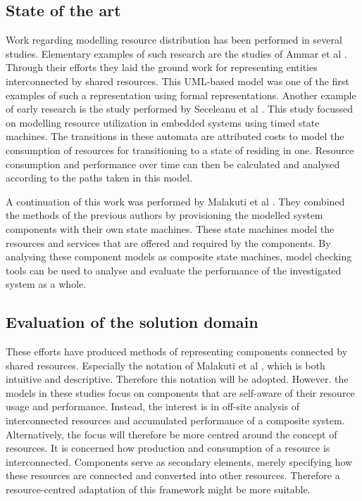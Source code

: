 \subsection{State of the art}
Work regarding modelling resource distribution has been performed in several studies. Elementary examples of such research are the studies of Ammar et al \cite{rum_basis_2}. Through their efforts they laid the ground work for representing entities interconnected by shared resources. This UML-based model was one of the first examples of such a representation using formal representations. Another example of early research is the study performed by Seceleanu et al \cite{rum_basis_89}. This study focussed on modelling resource utilization in embedded systems using timed state machines. The transitions in these automata are attributed costs to model the consumption of resources for transitioning to a state of residing in one. Resource consumption and performance over time  can then be calculated and analysed according to the paths taken in this model.

A continuation of this work was performed by Malakuti et al \cite{steven_te_brinke}. They combined the methods of the previous authors by provisioning the modelled system components with their own state machines. These state machines model the resources and services that are offered and required by the components. By analysing these component models as composite state machines, model checking tools can be used to analyse and evaluate the performance of the investigated system as a whole.

\subsection{Evaluation of the solution domain}
These efforts have produced methods of representing components connected by shared resources. Especially the notation of Malakuti et al \cite{steven_te_brinke}, which is both intuitive and descriptive. Therefore this notation will be adopted. However. the models in these studies focus on components that are self-aware of their resource usage and performance. Instead, the interest is in off-site analysis of interconnected resources and accumulated performance of a composite system. Alternatively, the focus will therefore be more centred around the concept of resources. It is concerned how production and consumption of a resource is interconnected. Components serve as secondary elements, merely specifying how these resources are connected and converted into other resources. Therefore a resource-centred adaptation of this framework might be more suitable.

